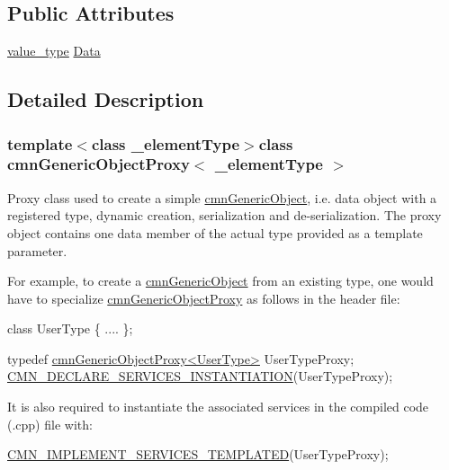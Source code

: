 \subsection*{Public Attributes}
\begin{DoxyCompactItemize}
\item 
\hyperlink{classcmn_generic_object_proxy_a5a3db96e5acd73055d5d34c25c1635f3}{value\+\_\+type} \hyperlink{classcmn_generic_object_proxy_a1c215839c40dbb71a7e2609b71a80f71}{Data}
\end{DoxyCompactItemize}


\subsection{Detailed Description}
\subsubsection*{template$<$class \+\_\+element\+Type$>$class cmn\+Generic\+Object\+Proxy$<$ \+\_\+element\+Type $>$}

Proxy class used to create a simple \hyperlink{classcmn_generic_object}{cmn\+Generic\+Object}, i.\+e. data object with a registered type, dynamic creation, serialization and de-\/serialization. The proxy object contains one data member of the actual type provided as a template parameter.

For example, to create a \hyperlink{classcmn_generic_object}{cmn\+Generic\+Object} from an existing type, one would have to specialize \hyperlink{classcmn_generic_object_proxy}{cmn\+Generic\+Object\+Proxy} as follows in the header file\+: 
\begin{DoxyCode}
\textcolor{keyword}{class }UserType \{
    ....
\};

\textcolor{keyword}{typedef} \hyperlink{classcmn_generic_object_proxy}{cmnGenericObjectProxy<UserType>} UserTypeProxy;
\hyperlink{cmn_class_register_macros_8h_a198d81818e0b66ebe53e692dc7c5d058}{CMN\_DECLARE\_SERVICES\_INSTANTIATION}(UserTypeProxy);
\end{DoxyCode}


It is also required to instantiate the associated services in the compiled code (.cpp) file with\+: 
\begin{DoxyCode}
\hyperlink{cmn_class_register_macros_8h_a6d3e8cb412f66ff7e73f3ab52290f471}{CMN\_IMPLEMENT\_SERVICES\_TEMPLATED}(UserTypeProxy);
\end{DoxyCode}


